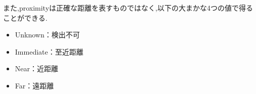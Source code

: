 また,proximityは正確な距離を表すものではなく,以下の大まかな4つの値で得ることができる.

\begin{itemize}
\item Unknown：検出不可
\item Immediate：至近距離
\item Near：近距離
\item Far：遠距離
\end{itemize}
